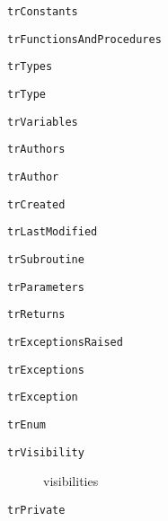 \documentclass{report}
\begin{document}
\begin{list}{}
\begin{description}
\item[\texttt{trConstants}] \label{PasDoc_Languages-trConstants}
\index{}
 
\item[\texttt{trFunctionsAndProcedures}] \label{PasDoc_Languages-trFunctionsAndProcedures}
\index{}
 
\item[\texttt{trTypes}] \label{PasDoc_Languages-trTypes}
\index{}
 
\item[\texttt{trType}] \label{PasDoc_Languages-trType}
\index{}
 
\item[\texttt{trVariables}] \label{PasDoc_Languages-trVariables}
\index{}
 
\item[\texttt{trAuthors}] \label{PasDoc_Languages-trAuthors}
\index{}
 
\item[\texttt{trAuthor}] \label{PasDoc_Languages-trAuthor}
\index{}
 
\item[\texttt{trCreated}] \label{PasDoc_Languages-trCreated}
\index{}
 
\item[\texttt{trLastModified}] \label{PasDoc_Languages-trLastModified}
\index{}
 
\item[\texttt{trSubroutine}] \label{PasDoc_Languages-trSubroutine}
\index{}
 
\item[\texttt{trParameters}] \label{PasDoc_Languages-trParameters}
\index{}
 
\item[\texttt{trReturns}] \label{PasDoc_Languages-trReturns}
\index{}
 
\item[\texttt{trExceptionsRaised}] \label{PasDoc_Languages-trExceptionsRaised}
\index{}
 
\item[\texttt{trExceptions}] \label{PasDoc_Languages-trExceptions}
\index{}
 
\item[\texttt{trException}] \label{PasDoc_Languages-trException}
\index{}
 
\item[\texttt{trEnum}] \label{PasDoc_Languages-trEnum}
\index{}
 
\item[\texttt{trVisibility}] \label{PasDoc_Languages-trVisibility}
\index{}
visibilities
\item[\texttt{trPrivate}] \label{PasDoc_Languages-trPrivate}
\index{}
 

\end{description}
\end{list}
\end{document}
